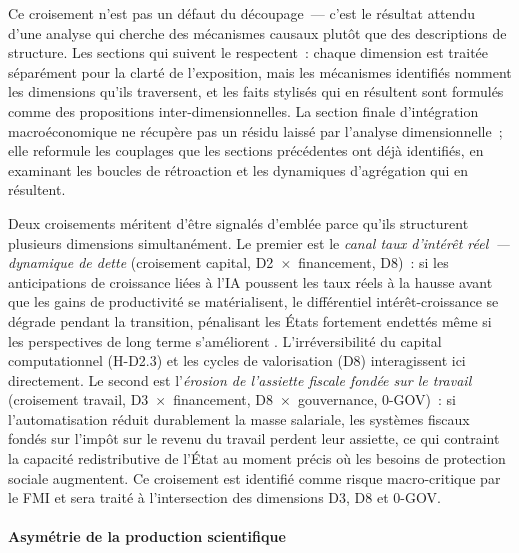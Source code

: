 Ce croisement n'est pas un défaut du découpage~--- c'est le résultat attendu d'une analyse qui cherche des mécanismes causaux plutôt que des descriptions de structure. Les sections qui suivent le respectent~: chaque dimension est traitée séparément pour la clarté de l'exposition, mais les mécanismes identifiés nomment les dimensions qu'ils traversent, et les faits stylisés qui en résultent sont formulés comme des propositions inter-dimensionnelles. La section finale d'intégration macroéconomique ne récupère pas un résidu laissé par l'analyse dimensionnelle~; elle reformule les couplages que les sections précédentes ont déjà identifiés, en examinant les boucles de rétroaction et les dynamiques d'agrégation qui en résultent.

Deux croisements méritent d'être signalés d'emblée parce qu'ils structurent plusieurs dimensions simultanément. Le premier est le \emph{canal taux d'intérêt réel~--- dynamique de dette} (croisement capital, D2~$\times$~financement, D8)~: si les anticipations de croissance liées à l'IA poussent les taux réels à la hausse avant que les gains de productivité se matérialisent, le différentiel intérêt-croissance se dégrade pendant la transition, pénalisant les États fortement endettés même si les perspectives de long terme s'améliorent \parencite{chow_halperin_mazlish_2025,barhoumi_imf_ai_2026}. L'irréversibilité du capital computationnel (H-D2.3) et les cycles de valorisation (D8) interagissent ici directement. Le second est l'\emph{érosion de l'assiette fiscale fondée sur le travail} (croisement travail, D3~$\times$~financement, D8~$\times$~gouvernance, 0-GOV)~: si l'automatisation réduit durablement la masse salariale, les systèmes fiscaux fondés sur l'impôt sur le revenu du travail perdent leur assiette, ce qui contraint la capacité redistributive de l'État au moment précis où les besoins de protection sociale augmentent. Ce croisement est identifié comme risque macro-critique par le FMI \parencite{barhoumi_imf_ai_2026} et sera traité à l'intersection des dimensions D3, D8 et 0-GOV.

\paragraph{Asymétrie de la production scientifique}

